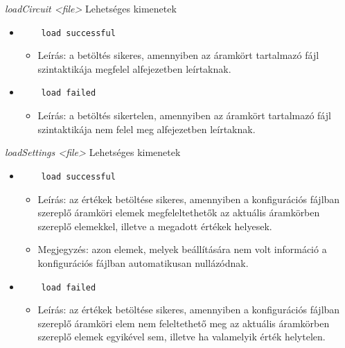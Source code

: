 \textit{loadCircuit <file>}\newline
Lehetséges kimenetek
\begin{itemize}
	\item
	\begin{verbatim}
	load successful
	\end{verbatim}
	\begin{itemize}
		\item Leírás: a betöltés sikeres, amennyiben az áramkört tartalmazó fájl szintaktikája megfelel  alfejezetben leírtaknak.
	\end{itemize}
	\item 
	\begin{verbatim}
	load failed
	\end{verbatim}
	\begin{itemize}
		\item Leírás: a betöltés sikertelen, amennyiben az áramkört tartalmazó fájl szintaktikája nem felel meg  alfejezetben leírtaknak.
	\end{itemize}
\end{itemize}

\textit{loadSettings <file>}\newline
Lehetséges kimenetek
\begin{itemize}
	\item
	\begin{verbatim}
	load successful
	\end{verbatim}
	\begin{itemize}
		\item Leírás: az értékek betöltése sikeres, amennyiben a konfigurációs fájlban szereplő áramköri elemek megfeleltethetők az aktuális áramkörben szereplő elemekkel, illetve a megadott értékek helyesek.
		\item Megjegyzés: azon elemek, melyek beállítására nem volt információ a konfigurációs fájlban automatikusan nullázódnak.
	\end{itemize}
	\item
	\begin{verbatim}
	load failed
	\end{verbatim}
	\begin{itemize}
		\item Leírás: az értékek betöltése sikeres, amennyiben a konfigurációs fájlban szereplő áramköri elem nem feleltethető meg az aktuális áramkörben szereplő elemek egyikével sem, illetve ha valamelyik érték helytelen.
	\end{itemize}
\end{itemize}

